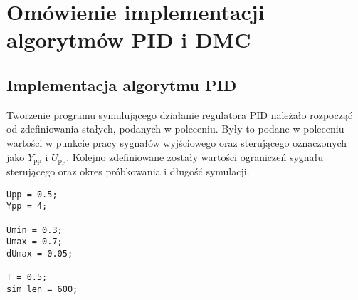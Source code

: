 

\chapter{Omówienie implementacji algorytmów PID i DMC}
\label{zad4}

\section{Implementacja algorytmu PID}
\label{zad4_pid}
Tworzenie programu symulującego działanie regulatora PID należało rozpocząć od zdefiniowania stałych, podanych w poleceniu. Były to podane w poleceniu wartości w punkcie pracy sygnałów wyjściowego oraz sterującego oznaczonych jako $Y_{\mathrm{pp}}$ i $U_{\mathrm{pp}}$. Kolejno zdefiniowane zostały wartości ograniczeń sygnału sterującego oraz okres próbkowania i długość symulacji.
\\ 

\begin{lstlisting}[style=custommatlab,frame=single,label={zad4_const_lst},caption={Definicja stałych wartości używanych w programie},captionpos=b]
Upp = 0.5;
Ypp = 4;

Umin = 0.3;
Umax = 0.7;
dUmax = 0.05;

T = 0.5;   
sim_len = 600;
\end{lstlisting}


